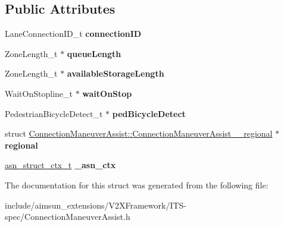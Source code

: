 \subsection*{Public Attributes}
\begin{DoxyCompactItemize}
\item 
Lane\+Connection\+I\+D\+\_\+t {\bfseries connection\+ID}\hypertarget{structConnectionManeuverAssist_afac8b991af39c0942452aeea2865faa1}{}\label{structConnectionManeuverAssist_afac8b991af39c0942452aeea2865faa1}

\item 
Zone\+Length\+\_\+t $\ast$ {\bfseries queue\+Length}\hypertarget{structConnectionManeuverAssist_a89ffe08c65eaffcc7bbc580acb9708ee}{}\label{structConnectionManeuverAssist_a89ffe08c65eaffcc7bbc580acb9708ee}

\item 
Zone\+Length\+\_\+t $\ast$ {\bfseries available\+Storage\+Length}\hypertarget{structConnectionManeuverAssist_abc6b3d69f6242b184f18de0367a2ea7e}{}\label{structConnectionManeuverAssist_abc6b3d69f6242b184f18de0367a2ea7e}

\item 
Wait\+On\+Stopline\+\_\+t $\ast$ {\bfseries wait\+On\+Stop}\hypertarget{structConnectionManeuverAssist_a7bd74b6f26851952a6abb579311fc274}{}\label{structConnectionManeuverAssist_a7bd74b6f26851952a6abb579311fc274}

\item 
Pedestrian\+Bicycle\+Detect\+\_\+t $\ast$ {\bfseries ped\+Bicycle\+Detect}\hypertarget{structConnectionManeuverAssist_a1ea595de6a5845a1853d4c4817936deb}{}\label{structConnectionManeuverAssist_a1ea595de6a5845a1853d4c4817936deb}

\item 
struct \hyperlink{structConnectionManeuverAssist_1_1ConnectionManeuverAssist____regional}{Connection\+Maneuver\+Assist\+::\+Connection\+Maneuver\+Assist\+\_\+\+\_\+regional} $\ast$ {\bfseries regional}\hypertarget{structConnectionManeuverAssist_a26ec30919c70ad0988976ed49d962b2f}{}\label{structConnectionManeuverAssist_a26ec30919c70ad0988976ed49d962b2f}

\item 
\hyperlink{structasn__struct__ctx__s}{asn\+\_\+struct\+\_\+ctx\+\_\+t} {\bfseries \+\_\+asn\+\_\+ctx}\hypertarget{structConnectionManeuverAssist_a26f74a7a4c5c80fc2bccba95457c40af}{}\label{structConnectionManeuverAssist_a26f74a7a4c5c80fc2bccba95457c40af}

\end{DoxyCompactItemize}


The documentation for this struct was generated from the following file\+:\begin{DoxyCompactItemize}
\item 
include/aimsun\+\_\+extensions/\+V2\+X\+Framework/\+I\+T\+S-\/spec/Connection\+Maneuver\+Assist.\+h\end{DoxyCompactItemize}
